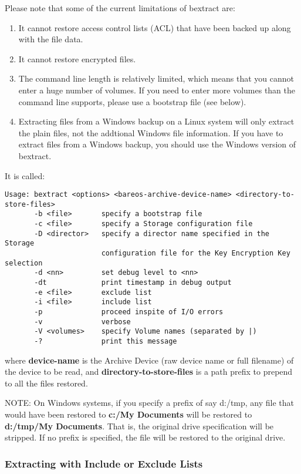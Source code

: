 Please note that some of the current limitations of bextract are:

\begin{enumerate}
\item It cannot restore access control lists (ACL) that have been
      backed up along with the file data.
\item It cannot restore encrypted files.
\item The command line length is relatively limited,
      which means that you cannot enter a huge number of volumes.  If you need to
      enter more volumes than the command line supports, please use a bootstrap
      file (see below).
\item Extracting files from a Windows backup on a Linux system
      will only extract the plain files, not the addtional Windows file information.
      If you have to extract files from a Windows backup,
      you should use the Windows version of bextract.
\end{enumerate}


It is called:

\footnotesize
\begin{verbatim}
Usage: bextract <options> <bareos-archive-device-name> <directory-to-store-files>
       -b <file>       specify a bootstrap file
       -c <file>       specify a Storage configuration file
       -D <director>   specify a director name specified in the Storage
                       configuration file for the Key Encryption Key selection
       -d <nn>         set debug level to <nn>
       -dt             print timestamp in debug output
       -e <file>       exclude list
       -i <file>       include list
       -p              proceed inspite of I/O errors
       -v              verbose
       -V <volumes>    specify Volume names (separated by |)
       -?              print this message
\end{verbatim}
\normalsize

where {\bf device-name} is the Archive Device (raw device name or full
filename) of the device to be read, and {\bf directory-to-store-files} is a
path prefix to prepend to all the files restored.

NOTE: On Windows systems, if you specify a prefix of say d:/tmp, any file that
would have been restored to {\bf c:/My Documents} will be restored to {\bf
d:/tmp/My Documents}. That is, the original drive specification will be
stripped. If no prefix is specified, the file will be restored to the original
drive.

\subsubsection{Extracting with Include or Exclude Lists}

